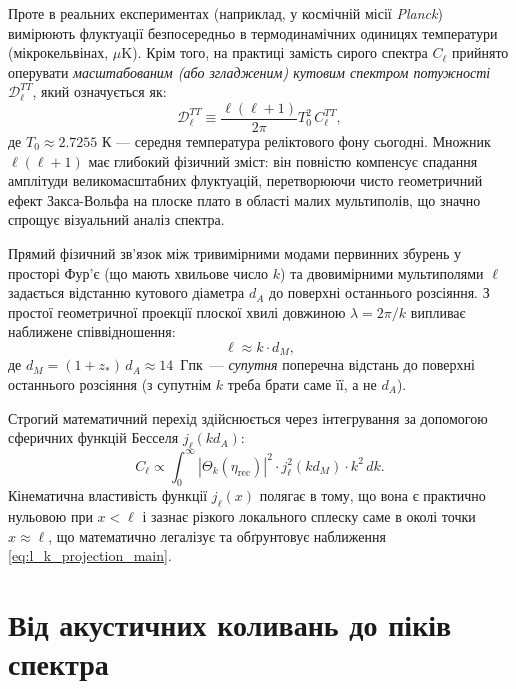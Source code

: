 Проте в реальних експериментах (наприклад, у космічній місії \emph{Planck}) вимірюють флуктуації безпосередньо в термодинамічних одиницях температури (мікрокельвінах, $\mu\text{K}$). Крім того, на практиці замість сирого спектра $C_\ell$ прийнято оперувати \emph{масштабованим (або згладженим) кутовим спектром потужності} $\mathcal{D}_\ell^{TT}$, який означується як:
\begin{equation}\label{eq:Dl_definition}
    \mathcal{D}_\ell^{TT} \equiv \frac{\ell(\ell+1)}{2\pi} T_0^2 \, C_\ell^{TT},
\end{equation}
де $T_0 \approx 2.7255\text{ К}$ --- середня температура реліктового фону сьогодні. Множник $\ell(\ell+1)$ має глибокий фізичний зміст: він повністю компенсує спадання амплітуди великомасштабних флуктуацій, перетворюючи чисто геометричний ефект Закса-Вольфа на плоске плато в області малих мультиполів, що значно спрощує візуальний аналіз спектра.

Прямий фізичний зв'язок між тривимірними модами первинних збурень у просторі Фур'є (що мають хвильове число $k$) та двовимірними мультиполями $\ell$ задається відстанню кутового діаметра $d_A$ до поверхні останнього розсіяння. З простої геометричної проекції плоскої хвилі довжиною $\lambda = 2\pi/k$ випливає наближене співвідношення:
\begin{equation}\label{eq:l_k_projection_main}
    \ell \approx k\cdot d_M,
\end{equation}
де $d_M = (1+z_*)\,d_A \approx 14$~Гпк~--- \emph{супутня} поперечна відстань до поверхні останнього розсіяння (з супутнім $k$ треба брати саме її, а не $d_A$).

Строгий математичний перехід здійснюється через інтегрування за допомогою сферичних функцій Бесселя $j_\ell(kd_A)$:
\begin{equation}\label{eq:bessel_integral_main}
    C_\ell \propto \int_0^{\infty}|\Theta_k(\eta_\text{rec})|^2\cdot j_\ell^2(kd_M)\cdot k^2\,dk.
\end{equation}
Кінематична властивість функції $j_\ell(x)$ полягає в тому, що вона є практично нульовою при $x < \ell$ і зазнає різкого локального сплеску саме в околі точки $x \approx \ell$, що математично легалізує та обґрунтовує наближення \eqref{eq:l_k_projection_main}.

\section{Від акустичних коливань до піків спектра}
\label{subsec:acoustic_oscillations}

